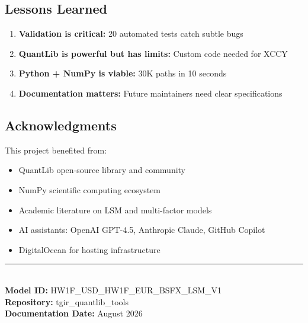 \documentclass[10pt,a4paper]{article}
\begin{document}
\subsection{Lessons Learned}

\begin{enumerate}
    \item \textbf{Validation is critical:} 20 automated tests catch subtle bugs
    \item \textbf{QuantLib is powerful but has limits:} Custom code needed for XCCY
    \item \textbf{Python + NumPy is viable:} 30K paths in 10 seconds
    \item \textbf{Documentation matters:} Future maintainers need clear specifications
\end{enumerate}

\subsection{Acknowledgments}

This project benefited from:
\begin{itemize}
    \item QuantLib open-source library and community
    \item NumPy scientific computing ecosystem
    \item Academic literature on LSM and multi-factor models
    \item AI assistants: OpenAI GPT-4.5, Anthropic Claude, GitHub Copilot
    \item DigitalOcean for hosting infrastructure
\end{itemize}

\vspace{1cm}
\begin{center}
\rule{0.5\textwidth}{0.4pt}\\[0.5cm]
\textbf{Model ID:} HW1F\_USD\_HW1F\_EUR\_BSFX\_LSM\_V1\\
\textbf{Repository:} tgir\_quantlib\_tools\\
\textbf{Documentation Date:} August 2026
\end{center}
\end{document}
